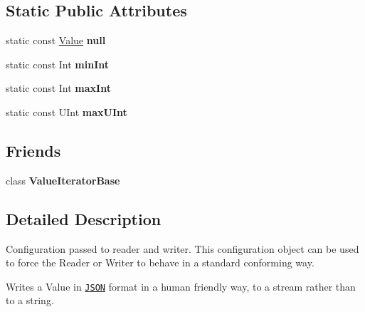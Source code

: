 \subsection*{Static Public Attributes}
\begin{DoxyCompactItemize}
\item 
\hypertarget{protocol_json_1_1_j_s_o_n___a_p_i_ac93090d15c633f942a091a876dcb8f9c}{static const \hyperlink{protocol_json_1_1_j_s_o_n___a_p_i_a3a85c4423131080eb9300546d6130dfd}{Value} {\bfseries null}}\label{protocol_json_1_1_j_s_o_n___a_p_i_ac93090d15c633f942a091a876dcb8f9c}

\item 
\hypertarget{protocol_json_1_1_j_s_o_n___a_p_i_a3c6b7f48958ebf357522e14c82f21a90}{static const Int {\bfseries min\-Int}}\label{protocol_json_1_1_j_s_o_n___a_p_i_a3c6b7f48958ebf357522e14c82f21a90}

\item 
\hypertarget{protocol_json_1_1_j_s_o_n___a_p_i_a34e3ac05230d2b91916958f036b4badd}{static const Int {\bfseries max\-Int}}\label{protocol_json_1_1_j_s_o_n___a_p_i_a34e3ac05230d2b91916958f036b4badd}

\item 
\hypertarget{protocol_json_1_1_j_s_o_n___a_p_i_a3cdaa96e9bbf12202d61005e87f70697}{static const U\-Int {\bfseries max\-U\-Int}}\label{protocol_json_1_1_j_s_o_n___a_p_i_a3cdaa96e9bbf12202d61005e87f70697}

\end{DoxyCompactItemize}
\subsection*{Friends}
\begin{DoxyCompactItemize}
\item 
\hypertarget{protocol_json_1_1_j_s_o_n___a_p_i_ad016df56489e5d360735457afba2f649}{class {\bfseries Value\-Iterator\-Base}}\label{protocol_json_1_1_j_s_o_n___a_p_i_ad016df56489e5d360735457afba2f649}

\end{DoxyCompactItemize}


\subsection{Detailed Description}
Configuration passed to reader and writer. This configuration object can be used to force the Reader or Writer to behave in a standard conforming way. 

Writes a Value in \href{http://www.json.org}{\tt J\-S\-O\-N} format in a human friendly way, to a stream rather than to a string.

